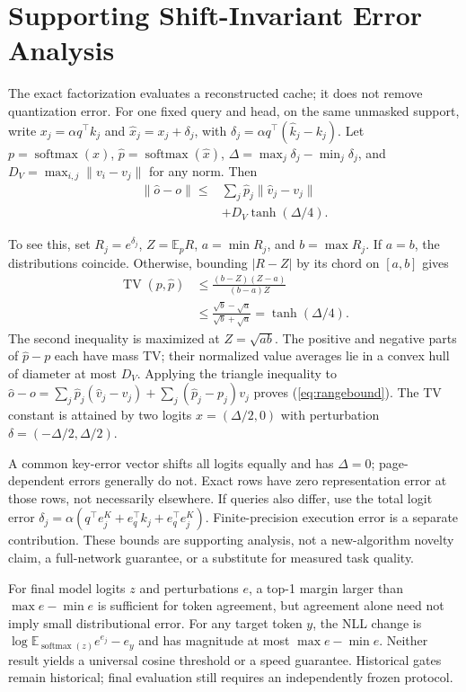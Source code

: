 \section{Supporting Shift-Invariant Error Analysis}
The exact factorization evaluates a reconstructed cache; it does not remove
quantization error. For one fixed query and head, on the same unmasked support,
write $x_j=\alpha q^\top k_j$ and
$\widehat x_j=x_j+\delta_j$, with
$\delta_j=\alpha q^\top(\widehat k_j-k_j)$.
Let $p=\operatorname{softmax}(x)$, $\widehat p=\operatorname{softmax}(\widehat x)$,
$\Delta=\max_j\delta_j-\min_j\delta_j$, and
$D_V=\max_{i,j}\|v_i-v_j\|$ for any norm. Then
\begin{equation}
\begin{split}
\|\widehat o-o\|\leq{}&\sum_j\widehat p_j\|\widehat v_j-v_j\|\\
&+D_V\tanh(\Delta/4).
\end{split}
\label{eq:rangebound}
\end{equation}

To see this, set $R_j=e^{\delta_j}$, $Z=\mathbb E_p R$,
$a=\min R_j$, and $b=\max R_j$. If $a=b$, the distributions coincide.
Otherwise, bounding $|R-Z|$ by its chord on $[a,b]$ gives
\begin{equation}
\begin{split}
\operatorname{TV}(p,\widehat p)
&\leq \frac{(b-Z)(Z-a)}{(b-a)Z}\\
&\leq \frac{\sqrt b-\sqrt a}{\sqrt b+\sqrt a}
=\tanh(\Delta/4).
\end{split}
\end{equation}
The second inequality is maximized at $Z=\sqrt{ab}$. The positive and negative
parts of $\widehat p-p$ each have mass TV; their normalized value averages lie
in a convex hull of diameter at most $D_V$. Applying the triangle inequality
to $\widehat o-o=\sum_j\widehat p_j(\widehat v_j-v_j)
+\sum_j(\widehat p_j-p_j)v_j$ proves (\ref{eq:rangebound}). The TV constant
is attained by two logits $x=(\Delta/2,0)$ with perturbation
$\delta=(-\Delta/2,\Delta/2)$.

A common key-error vector shifts all logits equally and has $\Delta=0$;
page-dependent errors generally do not. Exact rows have zero representation
error at those rows, not necessarily elsewhere. If queries also differ, use
the total logit error
$\delta_j=\alpha(q^\top e_j^K+e_q^\top k_j+e_q^\top e_j^K)$.
Finite-precision execution error is a separate contribution. These bounds are
supporting analysis, not a new-algorithm novelty claim, a full-network guarantee,
or a substitute for measured task quality.

For final model logits $z$ and perturbations $e$, a top-1 margin larger than
$\max e-\min e$ is sufficient for token agreement, but agreement alone need
not imply small distributional error. For any target token $y$, the NLL change
is $\log\mathbb E_{\operatorname{softmax}(z)}e^{e_j}-e_y$ and has magnitude at
most $\max e-\min e$. Neither result yields a universal cosine threshold or
a speed guarantee. Historical gates remain historical; final evaluation still
requires an independently frozen protocol.
